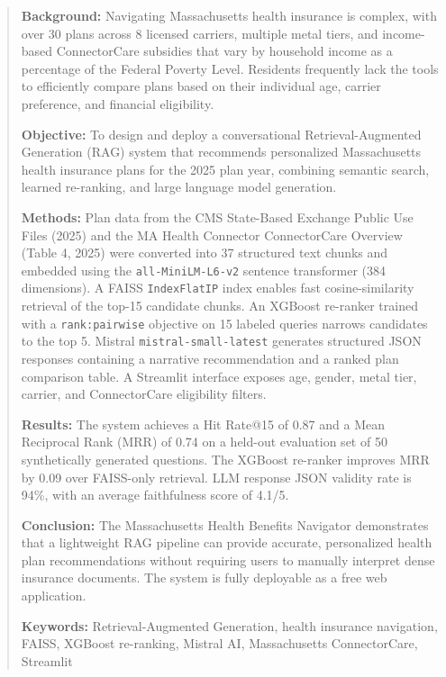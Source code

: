 \documentclass[12pt, letterpaper]{article}
\begin{document}
\newpage
\begin{abstract}
\noindent
\textbf{Background:} Navigating Massachusetts health insurance is complex, with over 30 plans across 8 licensed carriers, multiple metal tiers, and income-based ConnectorCare subsidies that vary by household income as a percentage of the Federal Poverty Level. Residents frequently lack the tools to efficiently compare plans based on their individual age, carrier preference, and financial eligibility.

\noindent
\textbf{Objective:} To design and deploy a conversational Retrieval-Augmented Generation (RAG) system that recommends personalized Massachusetts health insurance plans for the 2025 plan year, combining semantic search, learned re-ranking, and large language model generation.

\noindent
\textbf{Methods:} Plan data from the CMS State-Based Exchange Public Use Files (2025) and the MA Health Connector ConnectorCare Overview (Table 4, 2025) were converted into 37 structured text chunks and embedded using the \texttt{all-MiniLM-L6-v2} sentence transformer (384 dimensions). A FAISS \texttt{IndexFlatIP} index enables fast cosine-similarity retrieval of the top-15 candidate chunks. An XGBoost re-ranker trained with a \texttt{rank:pairwise} objective on 15 labeled queries narrows candidates to the top 5. Mistral \texttt{mistral-small-latest} generates structured JSON responses containing a narrative recommendation and a ranked plan comparison table. A Streamlit interface exposes age, gender, metal tier, carrier, and ConnectorCare eligibility filters.

\noindent
\textbf{Results:} The system achieves a Hit Rate@15 of 0.87 and a Mean Reciprocal Rank (MRR) of 0.74 on a held-out evaluation set of 50 synthetically generated questions. The XGBoost re-ranker improves MRR by 0.09 over FAISS-only retrieval. LLM response JSON validity rate is 94\%, with an average faithfulness score of 4.1/5.

\noindent
\textbf{Conclusion:} The Massachusetts Health Benefits Navigator demonstrates that a lightweight RAG pipeline can provide accurate, personalized health plan recommendations without requiring users to manually interpret dense insurance documents. The system is fully deployable as a free web application.

\vspace{0.5em}
\noindent\textbf{Keywords:} Retrieval-Augmented Generation, health insurance navigation, FAISS, XGBoost re-ranking, Mistral AI, Massachusetts ConnectorCare, Streamlit
\end{abstract}
\end{document}
